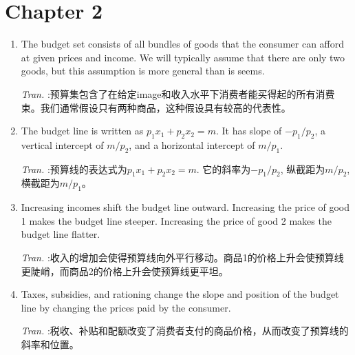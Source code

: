 \documentclass[11pt]{article}
\begin{document}
\section{Chapter 2}
\label{sec:orgd104b92}
\begin{enumerate}
\item The budget set consists of all bundles of goods that the consumer can afford at given prices and income. We will typically assume that there are only two goods, but this assumption is more general than is seems.

\emph{Tran.} :预算集包含了在给定image和收入水平下消费者能买得起的所有消费束。我们通常假设只有两种商品，这种假设具有较高的代表性。
\item The budget line is written as \(p_{1}x_{1} + p_{2}x_{2} = m\). It has slope of \(-p_{1}/p_{2}\), a vertical intercept of \(m/p_{2}\), and a horizontal intercept of \(m/p_{1}\).

\emph{Tran.} :预算线的表达式为\(p_{1}x_{1} + p_{2}x_{2} = m\). 它的斜率为\(-p_{1}/p_{2}\), 纵截距为\(m/p_{2}\), 横截距为\(m/p_{1}\)。
\item Increasing incomes shift the budget line outward. Increasing the price of good 1 makes the budget line steeper. Increasing the price of good 2 makes the budget line flatter.

\emph{Tran.} :收入的增加会使得预算线向外平行移动。商品1的价格上升会使预算线更陡峭，而商品2的价格上升会使预算线更平坦。
\item Taxes, subsidies, and rationing change the slope and position of the budget line by changing the prices paid by the consumer.

\emph{Tran.} :税收、补贴和配额改变了消费者支付的商品价格，从而改变了预算线的斜率和位置。
\end{enumerate}
\end{document}

